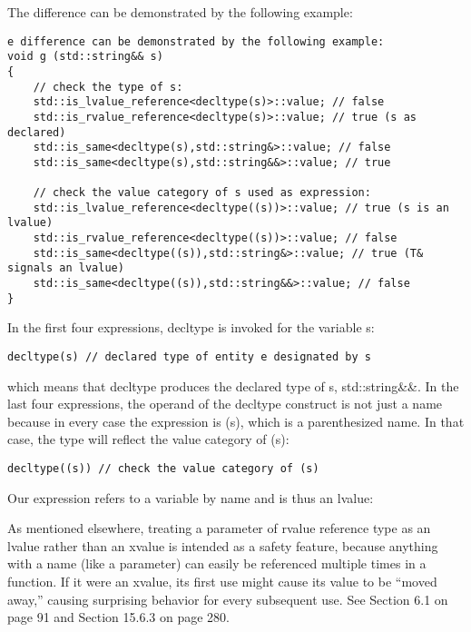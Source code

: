 The difference can be demonstrated by the following example:

\begin{lstlisting}[style=styleCXX]
e difference can be demonstrated by the following example:
void g (std::string&& s)
{
	// check the type of s:
	std::is_lvalue_reference<decltype(s)>::value; // false
	std::is_rvalue_reference<decltype(s)>::value; // true (s as declared)
	std::is_same<decltype(s),std::string&>::value; // false
	std::is_same<decltype(s),std::string&&>::value; // true
	
	// check the value category of s used as expression:
	std::is_lvalue_reference<decltype((s))>::value; // true (s is an lvalue)
	std::is_rvalue_reference<decltype((s))>::value; // false
	std::is_same<decltype((s)),std::string&>::value; // true (T& signals an lvalue)
	std::is_same<decltype((s)),std::string&&>::value; // false
}
\end{lstlisting}

In the first four expressions, decltype is invoked for the variable s:

\begin{lstlisting}[style=styleCXX]
decltype(s) // declared type of entity e designated by s
\end{lstlisting}

which means that decltype produces the declared type of s, std::string\&\&. In the last four expressions, the operand of the decltype construct is not just a name because in every case the expression is (s), which is a parenthesized name. In that case, the type will reflect the value category of (s):

\begin{lstlisting}[style=styleCXX]
decltype((s)) // check the value category of (s)
\end{lstlisting}

Our expression refers to a variable by name and is thus an lvalue:

\begin{tcolorbox}[colback=webgreen!5!white,colframe=webgreen!75!black]
\hspace*{0.75cm}As mentioned elsewhere, treating a parameter of rvalue reference type as an lvalue rather than an xvalue is intended as a safety feature, because anything with a name (like a parameter) can easily be referenced multiple times in a function. If it were an xvalue, its first use might cause its value to be “moved away,” causing surprising behavior for every subsequent use. See Section 6.1 on page 91 and Section 15.6.3 on page 280.
\end{tcolorbox}

